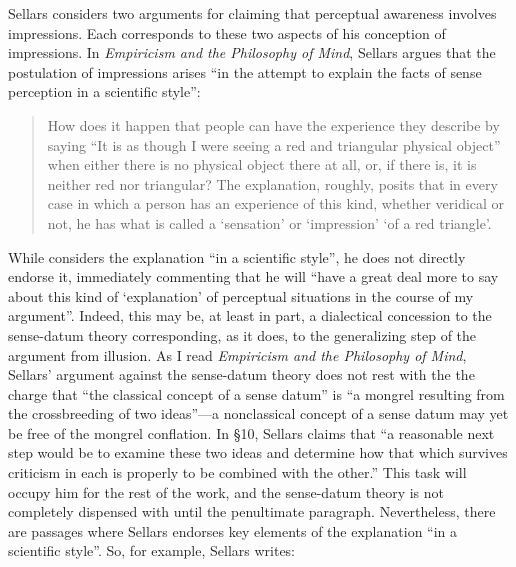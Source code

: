 \documentclass[12pt]{article}
\begin{document}

Sellars considers two arguments for claiming that perceptual awareness involves impressions. Each corresponds to these two aspects of his conception of impressions. In \emph{Empiricism and the Philosophy of Mind}, Sellars argues that the postulation of impressions arises ``in the attempt to explain the facts of sense perception in a scientific style'':
\begin{quote}
    How does it happen that people can have the experience they describe by saying ``It is as though I were seeing a red and triangular physical object'' when either there is no physical object there at all, or, if there is, it is neither red nor triangular? The explanation, roughly, posits that in every case in which a person has an experience of this kind, whether veridical or not, he has what is called a `sensation' or `impression' `of a red triangle'.  \citep[§7]{Sellars:1956xp} %
\end{quote}
While \cite[§7]{Sellars:1956xp} considers the explanation ``in a scientific style'', he does not directly endorse it, immediately commenting that he will ``have a great deal more to say about this kind of `explanation' of perceptual situations in the course of my argument''. Indeed, this may be, at least in part, a dialectical concession to the sense-datum theory corresponding, as it does, to the generalizing step of the argument from illusion. As I read \emph{Empiricism and the Philosophy of Mind}, Sellars' \citeyearpar[§7]{Sellars:1956xp} argument against the sense-datum theory does not rest with the the charge that ``the classical concept of a sense datum'' is ``a mongrel resulting from the crossbreeding of two ideas''---a nonclassical concept of a sense datum may yet be free of the mongrel conflation. In §10, Sellars claims that ``a reasonable next step would be to examine these two ideas and determine how that which survives criticism in each is properly to be combined with the other.'' This task will occupy him for the rest of the work, and the sense-datum theory is not completely dispensed with until the penultimate paragraph. Nevertheless, there are passages where Sellars endorses key elements of the explanation ``in a scientific style''. So, for example, Sellars writes: 
\end{document}
